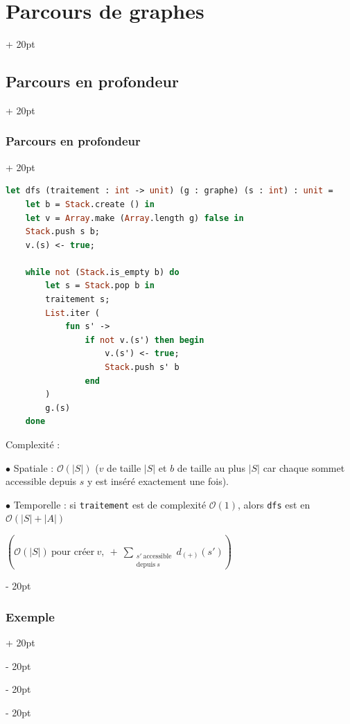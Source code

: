 \documentclass[a4paper, 12pt, twoside]{article}
\newcommand{\lr}[1]{\left( #1 \right)}
\newcommand{\abs}[1]{\left\lvert #1 \right\rvert}
\newcommand{\ind}[1][20pt]{\advance\leftskip + #1}
\newcommand{\deind}[1][20pt]{\advance\leftskip - #1}
\newenvironment{indt}[2][20pt]{#2 \par \ind[#1]}{\par \deind} %
\begin{document}
\begin{indt}{\section{Parcours de graphes}}
\begin{indt}{\subsection{Parcours en profondeur}}
\begin{indt}{\subsubsection{Parcours en profondeur}}
                \begin{lstlisting}[language=Caml, xleftmargin=80pt]
let dfs (traitement : int -> unit) (g : graphe) (s : int) : unit =
    let b = Stack.create () in
    let v = Array.make (Array.length g) false in
    Stack.push s b;
    v.(s) <- true;

    while not (Stack.is_empty b) do
        let s = Stack.pop b in
        traitement s;
        List.iter (
            fun s' ->
                if not v.(s') then begin
                    v.(s') <- true;
                    Stack.push s' b
                end
        )
        g.(s)
    done\end{lstlisting}

                \vspace{12pt}
                
                Complexité :

                $\bullet$ Spatiale : $\mathcal O(\abs S)$ ($v$ de taille $\abs S$ et $b$ de taille au plus $\abs S$ car chaque sommet accessible depuis $s$ y est inséré exactement une fois).

                $\bullet$ Temporelle : si \texttt{traitement} est de complexité $\mathcal O(1)$, alors \texttt{dfs} est en $\mathcal O\!\lr{\abs S + \abs A}$

                $\lr{\mathcal O(\abs S)\ \text{pour créer}\ v,\ +\ \displaystyle \sum_{\substack{s'\ \text{accessible} \\ \text{depuis}\ s}} d_{(+)}(s')}$
            \end{indt}

            \vspace{12pt}
            
            \begin{indt}{\subsubsection{Exemple}}
                \begin{center}
\end{center}
\end{indt}
\end{indt}
\end{indt}
\end{document}
